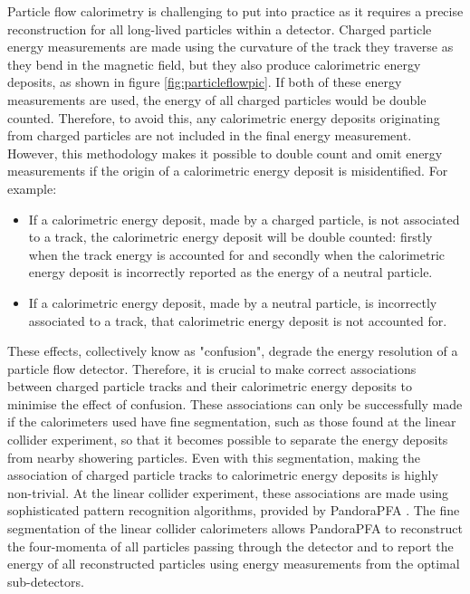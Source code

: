 Particle flow calorimetry is challenging to put into practice as it requires a precise reconstruction for all long-lived particles within a detector.  Charged particle energy measurements are made using the curvature of the track they traverse as they bend in the magnetic field, but they also produce calorimetric energy deposits, as shown in figure \ref{fig:particleflowpic}.  If both of these energy measurements are used, the energy of all charged particles would be double counted.  Therefore, to avoid this, any calorimetric energy deposits originating from charged particles are not included in the final energy measurement.  However, this methodology makes it possible to double count and omit energy measurements if the origin of a calorimetric energy deposit is misidentified.  For example:
\begin{itemize}
\item If a calorimetric energy deposit, made by a charged particle, is not associated to a track, the calorimetric energy deposit will be double counted: firstly when the track energy is accounted for and secondly when the calorimetric energy deposit is incorrectly reported as the energy of a neutral particle.  
\item If a calorimetric energy deposit, made by a neutral particle, is incorrectly associated to a track, that calorimetric energy deposit is not accounted for.
\end{itemize}
\noindent These effects, collectively know as "confusion", degrade the energy resolution of a particle flow detector.  Therefore, it is crucial to make correct associations between charged particle tracks and their calorimetric energy deposits to minimise the effect of confusion.  These associations can only be successfully made if the calorimeters used have fine segmentation, such as those found at the linear collider experiment, so that it becomes possible to separate the energy deposits from nearby showering particles.  Even with this segmentation, making the association of charged particle tracks to calorimetric energy deposits is highly non-trivial.  At the linear collider experiment, these associations are made using sophisticated pattern recognition algorithms, provided by PandoraPFA \cite{Marshall:2015rfa}.  The fine segmentation of the linear collider calorimeters allows PandoraPFA to reconstruct the four-momenta of all particles passing through the detector and to report the energy of all reconstructed particles using energy measurements from the optimal sub-detectors.  

